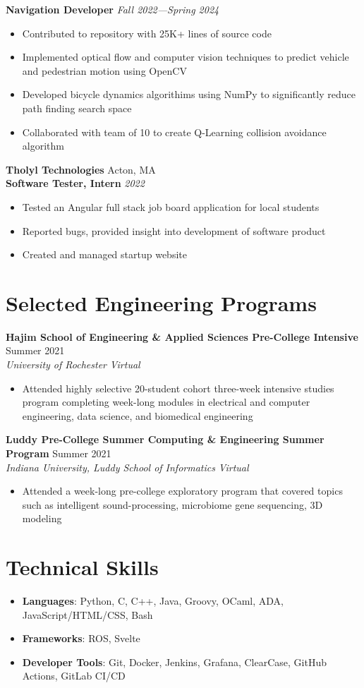 \documentclass[letterpaper,10pt]{article}
\newcommand{\company}[2]{
    \vspace{6pt}
    {\large \textbf{#1}}
    \hfill
    {\normalsize {#2}}
    \\
}
\newcommand{\position}[2]{
    \vspace{4pt}
    {\normalsize \textbf {#1}}
    \hfill
    {\normalsize \textit{#2}}
    \\
}
\newcommand{\resumeEntry}[4]{
    \vspace{4pt}
    {\large \textbf{#1}}
    \hfill
    {\normalsize #2}
    \\
    \textit{#3} \hfill \textit{#4}
    \vspace{1pt}
}
\newcommand{\itemsBegin}{
    \begin{itemize}[leftmargin=0.2in, labelsep=0.05in, itemsep=0pt, parsep=1pt, topsep=0pt, partopsep=0pt]
}
\newcommand{\itemsEnd}{\end{itemize}}
\begin{document}
    \position{Navigation Developer}{Fall 2022---Spring 2024}
    \itemsBegin{}
        \item Contributed to repository with 25K+ lines of source code
        \item Implemented optical flow and computer vision techniques to predict vehicle and pedestrian motion using OpenCV
        \item Developed bicycle dynamics algorithims using NumPy to significantly reduce path finding search space
        \item Collaborated with team of 10 to create Q-Learning collision avoidance algorithm
    \itemsEnd{}

    \company{Tholyl Technologies}{Acton, MA}

    \position{Software Tester, Intern}{2022}
    \itemsBegin
        \item Tested an Angular full stack job board application for local students
        \item Reported bugs, provided insight into development of software product
        \item Created and managed startup website
    \itemsEnd


\section{Selected Engineering Programs}


    \resumeEntry{Hajim School of Engineering \& Applied Sciences Pre-College Intensive}
        {Summer 2021}
        {University of Rochester}
        {Virtual}

    \itemsBegin{}
        \item Attended highly selective 20-student cohort three-week intensive studies program completing week-long modules in electrical and computer engineering, data science, and biomedical engineering
    \itemsEnd{}

    \resumeEntry{Luddy Pre-College Summer Computing \& Engineering Summer Program}
        {Summer 2021}
        {Indiana University, Luddy School of Informatics}
        {Virtual}

    \itemsBegin{}
        \item Attended a week-long pre-college exploratory program that covered topics such as intelligent sound-processing, microbiome gene sequencing, 3D modeling
    \itemsEnd{}

\section{Technical Skills}

    \itemsBegin{}
        \item \textbf{Languages}{: Python, C, C++, Java, Groovy, OCaml, ADA,  JavaScript/HTML/CSS, Bash}
        \item \textbf{Frameworks}{: ROS, Svelte}
        \item \textbf{Developer Tools}{: Git, Docker, Jenkins, Grafana, ClearCase, GitHub Actions, GitLab CI/CD }
    \itemsEnd{}
\end{document}
